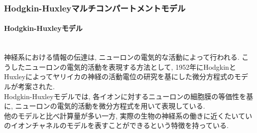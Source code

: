 \subsubsection{Hodgkin-Huxleyマルチコンパートメントモデル}
\paragraph{Hodgkin-Huxleyモデル}~\\
神経系における情報の伝達は, ニューロンの電気的な活動によって行われる.
こうしたニューロンの電気的活動を表現する方法として,
1952年にHodgkinとHuxleyによってヤリイカの神経の活動電位の研究を基にした微分方程式のモデルが考案された.\\
Hodgkin-Huxleyモデルでは, 各イオンに対するニューロンの細胞膜の等価性を基に, ニューロンの電気的活動を微分方程式を用いて表現している.\\
他のモデルと比べ計算量が多い一方, 実際の生物の神経系の働きに近くたいていのイオンチャネルのモデルを表すことができるという特徴を持っている.\\

